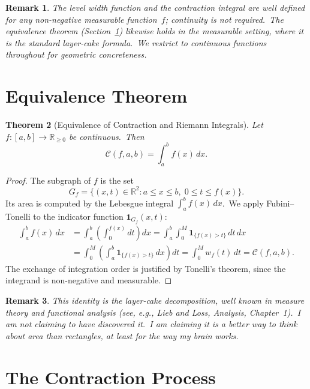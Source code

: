 \documentclass[11pt,a4paper]{article}
\newtheorem{theorem}{Theorem}[section]
\newtheorem{remark}[theorem]{Remark}
\begin{document}
\begin{remark}\label{rem:measurable}
The level width function and the contraction integral are well defined for any non-negative measurable function~$f$; continuity is not required.\ The equivalence theorem (Section~\ref{sec:equiv}) likewise holds in the measurable setting, where it is the standard layer-cake formula.\ We restrict to continuous functions throughout for geometric concreteness.
\end{remark}

\section{Equivalence Theorem}\label{sec:equiv}

\begin{theorem}[Equivalence of Contraction and Riemann Integrals]\label{thm:equiv}
Let $f:[a,b]\to\mathbb{R}_{\geq 0}$ be continuous.\ Then
\[
\mathcal{C}(f,a,b) = \int_a^b f(x)\,dx.
\]
\end{theorem}

\begin{proof}
The subgraph of $f$ is the set
\[
G_f = \{(x,t)\in\mathbb{R}^2 : a\leq x\leq b,\; 0\leq t\leq f(x)\}.
\]
Its area is computed by the Lebesgue integral $\int_a^b f(x)\,dx$.\ We apply Fubini--Tonelli to the indicator function $\mathbf{1}_{G_f}(x,t)$:
\begin{align*}
\int_a^b f(x)\,dx
&= \int_a^b\!\left(\int_0^{f(x)}dt\right)dx
= \int_a^b\int_0^M \mathbf{1}_{\{f(x)>t\}}\,dt\,dx \\
&= \int_0^M\!\left(\int_a^b \mathbf{1}_{\{f(x)>t\}}\,dx\right)dt
= \int_0^M w_f(t)\,dt
= \mathcal{C}(f,a,b).
\end{align*}
The exchange of integration order is justified by Tonelli's theorem, since the integrand is non-negative and measurable.
\end{proof}

\begin{remark}\label{rem:layer-cake}
This identity is the layer-cake decomposition, well known in measure theory and functional analysis (see, e.g., Lieb and Loss, \emph{Analysis}, Chapter~1).\ I am not claiming to have discovered it.\ I am claiming it is a better way to think about area than rectangles, at least for the way my brain works.
\end{remark}

\section{The Contraction Process}
\end{document}
